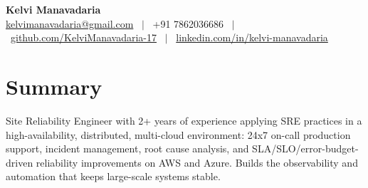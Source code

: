 \documentclass[a4paper,10.999999pt]{article}
\begin{document}
    \pagestyle{empty}



    \begin{center}
    \LARGE{\textbf{Kelvi Manavadaria}} \\[1.5pt]
    {\small
    \href{mailto:kelvimanavadaria@gmail.com}{kelvimanavadaria@gmail.com} \ $|$ \
    +91 7862036686 \ $|$ \
    \href{https://github.com/KelviManavadaria-17}{github.com/KelviManavadaria-17} \ $|$ \
    \href{https://www.linkedin.com/in/kelvi-manavadaria/}{linkedin.com/in/kelvi-manavadaria}
    }
    \end{center}

    \vspace{0.5pt}


    \section{Summary}
Site Reliability Engineer with 2+ years of experience applying SRE practices in a high-availability, distributed, multi-cloud environment: 24x7 on-call production support, incident management, root cause analysis, and SLA/SLO/error-budget-driven reliability improvements on AWS and Azure. Builds the observability and automation that keeps large-scale systems stable.

\end{document}
